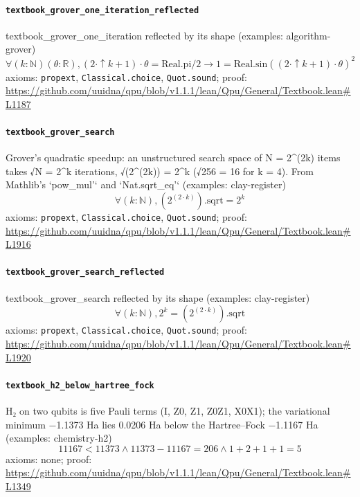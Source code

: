 \documentclass[11pt]{article}
\begin{document}
\paragraph{\texttt{textbook\_grover\_one\_iteration\_reflected}}
textbook\_grover\_one\_iteration reflected by its shape (examples: algorithm-grover)
\[ \forall (k : \mathbb{N}) (\theta : \mathbb{R}), (2 \cdot \uparrow k + 1) \cdot \theta = \mathrm{Real.pi} / 2 \to 1 = \mathrm{Real.sin} ((2 \cdot \uparrow k + 1) \cdot \theta ) ^{2} \]
\noindent axioms: \texttt{propext}, \texttt{Classical.choice}, \texttt{Quot.sound}; proof: \url{https://github.com/uuidna/qpu/blob/v1.1.1/lean/Qpu/General/Textbook.lean\#L1187}

\paragraph{\texttt{textbook\_grover\_search}}
Grover's quadratic speedup: an unstructured search space of N = 2\^{}(2k) items takes √N = 2\^{}k iterations, √(2\^{}(2k)) = 2\^{}k (√256 = 16 for k = 4). From Mathlib's `pow\_mul'` and `Nat.sqrt\_eq'` (examples: clay-register)
\[ \forall (k : \mathbb{N}), (2 ^{(2 \cdot k)})\mathrm{.sqrt} = 2 ^{k} \]
\noindent axioms: \texttt{propext}, \texttt{Classical.choice}, \texttt{Quot.sound}; proof: \url{https://github.com/uuidna/qpu/blob/v1.1.1/lean/Qpu/General/Textbook.lean\#L1916}

\paragraph{\texttt{textbook\_grover\_search\_reflected}}
textbook\_grover\_search reflected by its shape (examples: clay-register)
\[ \forall (k : \mathbb{N}), 2 ^{k} = (2 ^{(2 \cdot k)})\mathrm{.sqrt} \]
\noindent axioms: \texttt{propext}, \texttt{Classical.choice}, \texttt{Quot.sound}; proof: \url{https://github.com/uuidna/qpu/blob/v1.1.1/lean/Qpu/General/Textbook.lean\#L1920}

\paragraph{\texttt{textbook\_h2\_below\_hartree\_fock}}
H₂ on two qubits is five Pauli terms (I, Z0, Z1, Z0Z1, X0X1); the variational minimum −1.1373 Ha lies 0.0206 Ha below the Hartree–Fock −1.1167 Ha (examples: chemistry-h2)
\[ 11167 < 11373 \land 11373 - 11167 = 206 \land 1 + 2 + 1 + 1 = 5 \]
\noindent axioms: none; proof: \url{https://github.com/uuidna/qpu/blob/v1.1.1/lean/Qpu/General/Textbook.lean\#L1349}
\end{document}
